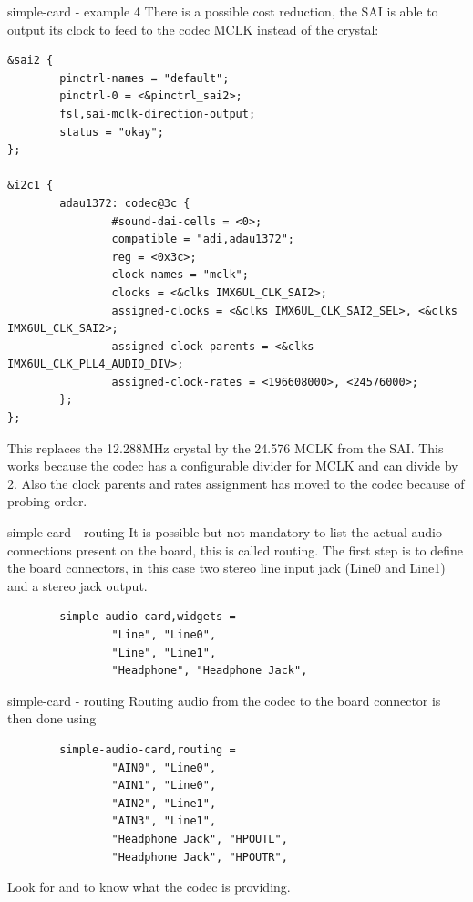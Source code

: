 \begin{frame}[fragile]{simple-card - example 4}
  There is a possible cost reduction, the SAI is able to output its
  clock to feed to the codec MCLK instead of the crystal:
  \begin{block}{}
    \fontsize{7}{6}\selectfont
    \begin{verbatim}
&sai2 {
        pinctrl-names = "default";
        pinctrl-0 = <&pinctrl_sai2>;
        fsl,sai-mclk-direction-output;
        status = "okay";
};

&i2c1 {
        adau1372: codec@3c {
                #sound-dai-cells = <0>;
                compatible = "adi,adau1372";
                reg = <0x3c>;
                clock-names = "mclk";
                clocks = <&clks IMX6UL_CLK_SAI2>;
                assigned-clocks = <&clks IMX6UL_CLK_SAI2_SEL>, <&clks IMX6UL_CLK_SAI2>;
                assigned-clock-parents = <&clks IMX6UL_CLK_PLL4_AUDIO_DIV>;
                assigned-clock-rates = <196608000>, <24576000>;
        };
};
    \end{verbatim}
  \end{block}
  This replaces the 12.288MHz crystal by the 24.576 MCLK from the SAI.
  This works because the codec has a configurable divider for MCLK and
  can divide by 2. Also the clock parents and rates assignment has
  moved to the codec because of probing order.
\end{frame}

\begin{frame}[fragile]{simple-card - routing}
  It is possible but not mandatory to list the actual audio
  connections present on the board, this is called routing.
  The first step is to define the board connectors, in this case two
  stereo line input jack (Line0 and Line1) and a stereo jack output.
  \begin{block}{}
    \fontsize{7}{6}\selectfont
    \begin{verbatim}
        simple-audio-card,widgets =
                "Line", "Line0",
                "Line", "Line1",
                "Headphone", "Headphone Jack",
    \end{verbatim}
  \end{block}
\end{frame}

\begin{frame}[fragile]{simple-card - routing}
  Routing audio from the codec to the board connector is then done
  using 
  \begin{block}{}
    \fontsize{7}{6}\selectfont
    \begin{verbatim}
        simple-audio-card,routing =
                "AIN0", "Line0",
                "AIN1", "Line0",
                "AIN2", "Line1",
                "AIN3", "Line1",
                "Headphone Jack", "HPOUTL",
                "Headphone Jack", "HPOUTR",
    \end{verbatim}
  \end{block}
  Look for  and  to
  know what the codec is providing.
\end{frame}

